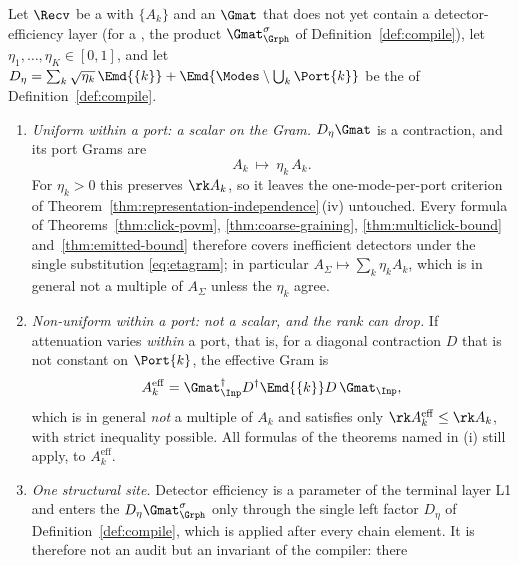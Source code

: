 \begin{theorem}\label{thm:efficiency}
Let $\Recv$ be a  with  $\{A_k\}$ and an  $\Gmat$ that does not yet
contain a detector-efficiency layer (for a , the
product $\Gmat^{\sigma}_{\Grph}$ of Definition~\ref{def:compile}), let
$\eta_1,\dots,\eta_K\in[0,1]$, and let
$D_\eta=\sum_k\sqrt{\eta_k}\,\Emd{\{k\}}+\Emd{\Modes\setminus\bigcup_k\Port{k}}$
be the  of
Definition~\ref{def:compile}.
\begin{enumerate}[label=(\roman*),leftmargin=3.0em]
\item \emph{Uniform within a port: a scalar on the Gram.} $D_\eta\Gmat$ is a
  contraction, and its port Grams are
  \begin{equation}\label{eq:etagram}
    A_k\ \longmapsto\ \eta_k\,A_k .
  \end{equation}
  For $\eta_k>0$ this preserves $\rk A_k$, so it leaves the one-mode-per-port
  criterion of Theorem~\ref{thm:representation-independence}\,(iv) untouched. Every formula of
  Theorems~\ref{thm:click-povm}, \ref{thm:coarse-graining}, \ref{thm:multiclick-bound}
  and~\ref{thm:emitted-bound} therefore covers inefficient detectors under the
  single substitution \eqref{eq:etagram}; in particular
  $A_\Sigma\mapsto\sum_k\eta_kA_k$, which is in general not a multiple of
  $A_\Sigma$ unless the $\eta_k$ agree.
\item \emph{Non-uniform within a port: not a scalar, and the rank can drop.} If
  attenuation varies \emph{within} a port, that is, for a diagonal contraction
  $D$ that is not constant on $\Port{k}$, the effective Gram is
  \begin{equation}\label{eq:noneffgram}
    A_k^{\mathrm{eff}}=\Gmat_{\Inp}^\dagger D^\dagger\Emd{\{k\}}D\,
    \Gmat_{\Inp},
  \end{equation}
  which is in general \emph{not} a multiple of $A_k$ and satisfies only
  $\rk A_k^{\mathrm{eff}}\le\rk A_k$, with strict inequality possible. All
  formulas of the theorems named in (i) still apply, to $A_k^{\mathrm{eff}}$.
\item \emph{One structural site.} Detector efficiency is a parameter of the
  terminal layer L1 and enters the 
  $D_\eta\Gmat^{\sigma}_{\Grph}$ only through the single left factor
  $D_\eta$ of Definition~\ref{def:compile}, which is applied after every chain
  element. It is therefore not an audit but an invariant of the compiler: there

\end{enumerate}
\end{theorem}
